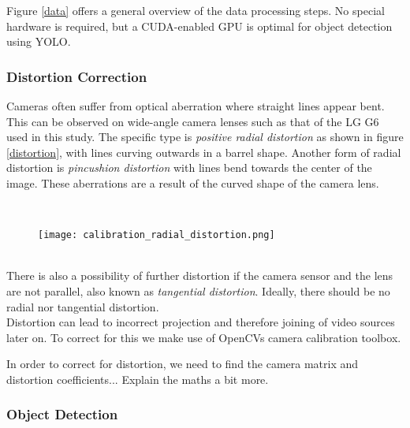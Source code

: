 Figure \ref{data} offers a general overview of the data processing steps. No special hardware is required, but a CUDA-enabled GPU is optimal for object detection using YOLO.
\ \\
\subsubsection{Distortion Correction}

Cameras often suffer from optical aberration where straight lines appear bent. This can be observed on wide-angle camera lenses such as that of the LG G6 used in this study.
The specific type is \textit{positive radial distortion} as shown in figure \ref{distortion}, with lines curving outwards in a barrel shape.
Another form of radial distortion is \textit{pincushion distortion} with lines bend towards the center of the image. These aberrations are a result 
of the curved shape of the camera lens.

\ \\ 
\begin{figure}[h]
  \texttt{[image: calibration\_radial\_distortion.png]}
  \centering 
  \end{figure}
  \label{distortion}

\ \\

There is also a possibility of further distortion if the camera sensor and the lens are not parallel, also known as \textit{tangential distortion}.
Ideally, there should be no radial nor tangential distortion.
\ \\
Distortion can lead to incorrect projection and therefore joining of video sources later on.
To correct for this we make use of OpenCVs \cite{noauthor_opencv/opencv_2021} camera calibration toolbox.

\color{red}
In order to correct for distortion, we need to find the camera matrix and distortion coefficients... Explain the maths a bit more.
\color{black}
\ \\
\subsubsection{Object Detection}

